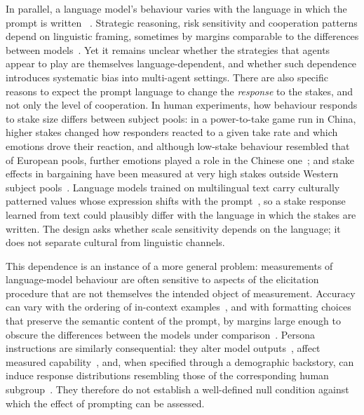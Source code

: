 \documentclass[11pt,a4paper]{article}
\newcommand{\rev}[1]{{\color{red}#1}}
\newcommand{\rev}[1]{#1}
\begin{document}
In parallel, a language model's behaviour varies with the language in which the
prompt is written ~\cite{buscemi2025fairgame}. Strategic reasoning, risk
sensitivity and cooperation patterns depend on linguistic framing, sometimes by
margins comparable to the differences between
models~\cite{loreheydari2024strategic,buscemi2025llms,buscemi2025strategic}.
Yet it remains unclear whether the strategies that agents appear to play are
themselves language-dependent, and whether such dependence introduces systematic
bias into multi-agent settings.
\rev{There are also specific reasons to expect the prompt language to change
the \emph{response} to the stakes, and not only the level of cooperation.
In human experiments, how behaviour responds to stake size differs between
subject pools: in a power-to-take game run in China, higher stakes changed how
responders reacted to a given take rate and which emotions drove their
reaction, and although low-stake behaviour resembled that of European pools,
further emotions played a role in the Chinese one~\cite{bosman2017emotion};
and stake effects in bargaining have been measured at very high stakes outside
Western subject pools~\cite{cameron1999raising}. Language models
trained on multilingual text carry culturally patterned values whose
expression shifts with the prompt~\cite{tao2024cultural}, so a stake response
learned from text could plausibly differ with the language in which the stakes
are written. The design asks whether scale sensitivity depends on the
language; it does not separate cultural from linguistic channels.}




This dependence is an instance of a more general problem: measurements of
language-model behaviour are often sensitive to aspects of the elicitation
procedure that are not themselves the intended object of measurement. Accuracy
can vary with the ordering of in-context examples~\cite{lu2022fantastically},
and with formatting choices that preserve the semantic content of the prompt,
by margins large enough to obscure the differences between the models under
comparison~\cite{sclar2024quantifying}. Persona instructions are similarly
consequential: they alter model outputs~\cite{deshpande2023toxicity}, affect
measured capability~\cite{salewski2023context}, and, when specified through a
demographic backstory, can induce response distributions resembling those of
the corresponding human subgroup~\cite{argyle2023out}. They therefore do not
establish a well-defined null condition against which the effect of prompting
can be assessed.
\end{document}
